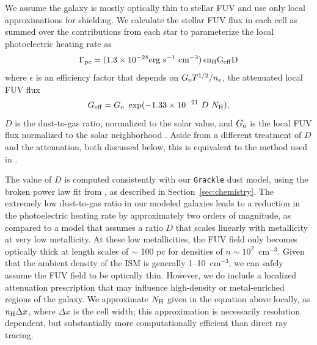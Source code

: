 \documentclass[twocolumn]{aastex61}
\newcommand{\ccunit}{cm$^{-3}$}
\begin{document}

We assume the galaxy is mostly optically thin to stellar FUV and use only local approximations for shielding.  We calculate the stellar FUV flux in each cell as summed over the contributions from each star to parameterize the local photoelectric heating rate as \citep{BakesTielens1994,Wolfire2003,Bergin2004}
\begin{equation}
\label{eq:PE}
\Gamma_{\rm pe} = (1.3 \times 10^{-24} \rm{erg~s^{-1}~cm^{-3}})\, \epsilon n_{\rm H} G_{\rm eff} D 
\end{equation}
where $\epsilon$ is an efficiency factor that depends on $G_{\rm{o}} T^{1/2} /n_{\rm{e}}$, the attenuated local FUV flux \begin{equation} G_{\rm eff} = G_{\rm o}~\exp(-1.33\times10^{-21}~D~N_{\rm H}), \end{equation} $D$ is the dust-to-gas ratio, normalized to the solar value, and $G_{\rm o}$ is the local FUV flux normalized to the solar neighborhood \citep{Habing1968}. Aside from a different treatment of $D$ and the attenuation, both discussed below, this is equivalent to the method used in \citet{Hu2016,Hu2017}.

The value of $D$ is computed consistently with our \texttt{Grackle} dust model, using the broken power law fit from \citet{Remy-Ruyer2014}, as described in Section~\ref{sec:chemistry}. The extremely low dust-to-gas ratio in our modeled galaxies leads to a reduction in the photoelectric heating rate by approximately two orders of magnitude, as compared to a model that assumes a ratio $D$ that scales linearly with metallicity at very low metallicity. At these low metallicities, the FUV field only becomes optically thick at length scales of $\sim$ 100 pc for densities of $n \sim 10^2$~\ccunit. Given that the ambient density of the ISM is generally 1--10~cm$^{-3}$, we can safely assume the FUV field to be optically thin. However, we do include a localized attenuation prescription that may influence high-density or metal-enriched regions of the galaxy. We approximate $N_{\rm H}$ given in the equation above locally, as $n_{\rm H}\Delta x$, where $\Delta x$ is the cell width; this approximation is necessarily resolution dependent, but substantially more computationally efficient than direct ray tracing.
\end{document}

